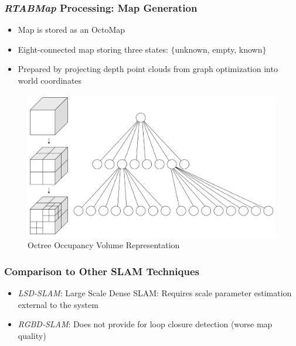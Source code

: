 \documentclass{beamer}
\begin{document}
\begin{frame}
\frametitle{\textit{RTABMap} Processing: Map Generation}
\begin{itemize}
\item{Map is stored as an OctoMap}
\item{Eight-connected map storing three states: $\{$unknown, empty, known$\}$}
\item{Prepared by projecting depth point clouds from graph optimization into world coordinates}
\end{itemize}
\begin{figure}
\includegraphics[width=0.6\linewidth]{figures/octree}
\caption{Octree Occupancy Volume Representation}
\end{figure}
\end{frame}

\begin{frame}
\frametitle{Comparison to Other SLAM Techniques}
\begin{itemize}
\item{\textit{LSD-SLAM}: Large Scale Dense SLAM: Requires scale parameter estimation external to the system}
\item{\textit{RGBD-SLAM}: Does not provide for loop closure detection (worse map quality)}
\end{itemize}
\end{frame}
\end{document}
